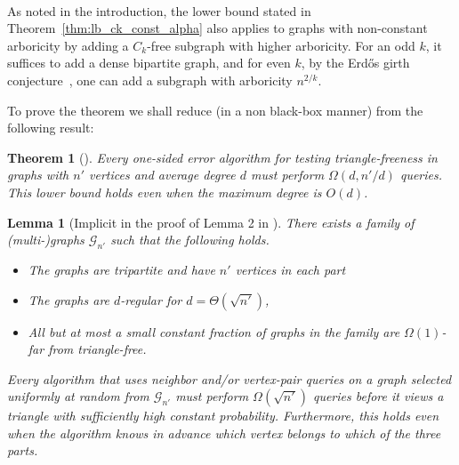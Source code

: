 \documentclass{article}
\newcommand{\eps}{\epsilon}
\newcommand{\mG}{{\mathcal{G}}}
\newcommand{\trn}{{n'}}
\newtheorem{theorem}{Theorem}
\newtheorem{lemma}{Lemma}
\newcommand{\commentt}[1]{ {}}
\newcommand{\talya}[1]{{} }
\newcommand{\ForFuture}[1]{}
\begin{document}
\medskip
{}~
\emph{\GenLB}


\medskip

As noted in the introduction, the lower bound stated in Theorem~\ref{thm:lb_ck_const_alpha} also applies to graphs with non-constant arboricity by adding a $C_k$-free subgraph with  higher arboricity. For an odd $k$, it suffices to add a dense bipartite graph, and for even $k$, by the Erd\H{o}s girth conjecture~\cite{E63}, one can add a subgraph with arboricity $n^{2/k}$.

\ForFuture{I still feel a bit weird about this, so just leaving a comment}


To prove the theorem we shall reduce (in a non black-box manner) from the following result:

\begin{theorem}[]\label{thm:triangle_freeness}
    Every one-sided error algorithm for testing triangle-freeness in graphs with $\trn$ vertices and average degree $d$ must
perform $\Omega(d,\trn/d)$ queries. This lower bound holds even when %
the maximum degree is $O(d)$.
\end{theorem}

\begin{lemma}[Implicit in the proof of Lemma 2 in \cite{AKKR08}]\label{lem:tri_free_hard_family}
There exists a family of (multi-)graphs $\mG_{\trn}$ such that 
the following holds.
\begin{itemize}
    \item The graphs  are tripartite and have $\trn$ vertices in each part
    \item The graphs are $d$-regular for $d=\Theta(\sqrt{\trn})$, 
    \item All but at most a small constant fraction of  graphs in the family  are $\Omega(1)$-far from triangle-free. 
\end{itemize}

Every algorithm that uses neighbor
and/or vertex-pair queries on a graph selected uniformly at random from  $\mG_{\trn}$ must perform $\Omega(\sqrt{\trn})$ queries before it 
views a triangle with sufficiently high constant probability.  
Furthermore, this holds even when the algorithm knows in advance which vertex belongs to which of the three parts.
\end{lemma}
\end{document}

